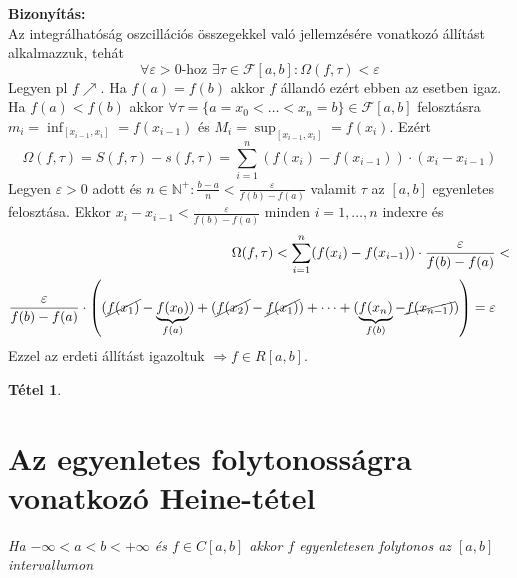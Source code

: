 \documentclass{article}
\newtheorem{theorem}{Tétel}
\renewenvironment{proof}{\textbf{Bizonyítás:} \\}{\hfill}
\begin{document}
\begin{proof}
Az integrálhatóság oszcillációs összegekkel való jellemzésére vonatkozó állítást alkalmazzuk, tehát
\begin{equation*}
    \forall \varepsilon > 0\textrm{-hoz } \exists \tau \in \mathcal{F}[a,b]:\Omega(f,\tau)< \varepsilon
\end{equation*}
Legyen pl $f \nearrow$. Ha $f(a) = f(b)$ akkor $f$ állandó ezért ebben az esetben igaz. Ha $f(a) < f(b)$ akkor $\forall\tau = \{a = x_0 < \dots < x_n = b\} \in \mathcal{F}[a,b]$ felosztásra $m_i = \displaystyle\inf_{[x_{i-1},x_i]}=f(x_{i-1})$ és $M_i = \displaystyle\sup_{[x_{i-1},x_i]}=f(x_i)$. Ezért
\begin{equation*}
    \Omega(f,\tau)=S(f,\tau)-s(f,\tau)=\sum_{i=1}^n(f(x_i)-f(x_{i-1}))\cdot(x_i-x_{i-1})
\end{equation*}
Legyen $\varepsilon > 0$ adott és $n\in\mathbb{N}^+:\frac{b-a}{n}<\frac{\varepsilon}{f(b)-f(a)}$ valamit $\tau$ az $[a,b]$ egyenletes felosztása. Ekkor $x_i-x_{i-1}<\frac{\varepsilon}{f(b)-f(a)}$ minden $i=1,\dots,n$ indexre és
\begin{equation*}
\begin{split}
    \Omega(f,\tau)<\sum_{i=1}^n(f(x_i)-f(x_{i-1}))\cdot \frac{\varepsilon}{f(b)-f(a)} & < \\
    \frac{\varepsilon}{f(b)-f(a)}\cdot\left((\cancel{f(x_1)} - \underbrace{f(x_0)}_{f(a)})+(\cancel{f(x_2)}-\cancel{f(x_1)})+\dots+(\underbrace{f(x_n)}_{f(b)}-\cancel{f(x_{n-1})})\right) = \varepsilon
\end{split}
\end{equation*}
Ezzel az erdeti állítást igazoltuk $\Longrightarrow f \in R[a,b]$.
\end{proof}
\newpage
\begin{theorem}
\section{Az egyenletes folytonosságra vonatkozó Heine-tétel} 
Ha $-\infty < a < b < +\infty$ és $f\in C[a,b]$ akkor $f$ egyenletesen folytonos az $[a,b]$ intervallumon
\end{theorem}
\end{document}
